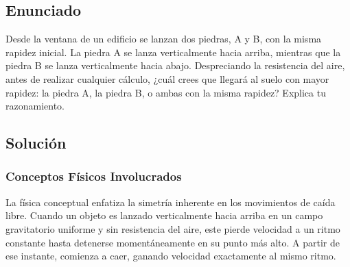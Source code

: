 \documentclass[12pt, a4paper]{article}
\begin{document}
\newpage

\subsection*{Enunciado}

Desde la ventana de un edificio se lanzan dos piedras, A y B, con la misma rapidez inicial. La piedra A se lanza verticalmente hacia arriba, mientras que la piedra B se lanza verticalmente hacia abajo. Despreciando la resistencia del aire, antes de realizar cualquier cálculo, ¿cuál crees que llegará al suelo con mayor rapidez: la piedra A, la piedra B, o ambas con la misma rapidez? Explica tu razonamiento.

\vspace{0.5cm}

\begin{center}
\end{center}

\subsection*{Solución}

\subsubsection*{Conceptos Físicos Involucrados}

La física conceptual enfatiza la simetría inherente en los movimientos de caída libre. Cuando un objeto es lanzado verticalmente hacia arriba en un campo gravitatorio uniforme y sin resistencia del aire, este pierde velocidad a un ritmo constante hasta detenerse momentáneamente en su punto más alto. A partir de ese instante, comienza a caer, ganando velocidad exactamente al mismo ritmo. 
\end{document}
